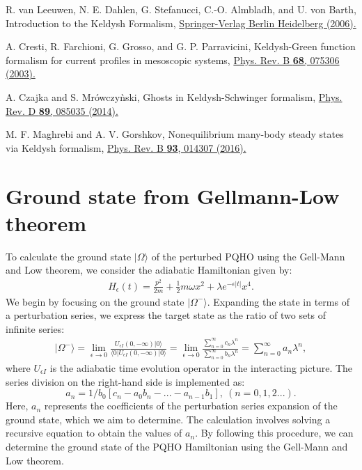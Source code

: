 \documentclass[twocolumn,pra,aps,superscriptaddress]{revtex4-2}
\begin{document}
\begin{thebibliography}{99}
 R. van Leeuwen, N. E. Dahlen, G. Stefanucci, C.-O. Almbladh, and U. von Barth, Introduction to the Keldysh Formalism, \href{10.1007/3-540-35426-3_3}{Springer-Verlag Berlin Heidelberg (2006).}

 A. Cresti, R. Farchioni, G. Grosso, and G. P. Parravicini, Keldysh-Green function formalism for current profiles in mesoscopic systems, \href{https://journals.aps.org/prb/abstract/10.1103/PhysRevB.68.075306}{Phys. Rev. B \textbf{68}, 075306 (2003).}

 A. Czajka and S. Mr\'owczy\`nski, Ghosts in Keldysh-Schwinger formalism, \href{https://journals.aps.org/prd/abstract/10.1103/PhysRevD.89.085035}{Phys. Rev. D \textbf{89}, 085035 (2014).}

 M. F. Maghrebi and A. V. Gorshkov, Nonequilibrium many-body steady states via Keldysh formalism, \href{https://journals.aps.org/prb/abstract/10.1103/PhysRevB.93.014307}{Phys. Rev. B \textbf{93}, 014307 (2016).} 

\end{thebibliography}


\appendix
\section{Ground state from Gellmann-Low theorem}\label{GSGL}

To calculate the ground state $|\Omega\rangle$ of the perturbed PQHO using the Gell-Mann and Low theorem, we consider the adiabatic Hamiltonian given by:
\begin{align}
 H_\epsilon(t)=\frac{p^{2}}{2m}+\frac{1}{2}m\omega x^{2}+\lambda  e^{-\epsilon |t|} x^{4}.
\end{align}
We begin by focusing on the ground state $|\Omega^-\rangle$. Expanding the state in terms of a perturbation series, we express the target state as the ratio of two sets of infinite series:
\begin{align}\label{Omega from G-L}
	|\Omega^-\rangle = \lim_{\epsilon\rightarrow 0} \frac{U_{\epsilon I}(0,-\infty)|0\rangle}{\langle0|U_{\epsilon I }(0, - \infty)|0\rangle} = \lim_{\epsilon\rightarrow 0} \frac{\sum_{n=0}^{\infty}c_n \lambda^n}{\sum_{n=0}^{\infty}b_n \lambda^n} = \sum_{n=0}^{\infty} a_n \lambda^n,
\end{align}
where $U_{\epsilon I}$ is the adiabatic time evolution operator in the interacting picture. The series division on the right-hand side is implemented as:
$$
a_n = {1}/{b_0} \left[ c_n - a_0 b_n -...- a_{n-1} b_1\right],~\left( n=0,1,2...\right).
$$
Here, $a_n$ represents the coefficients of the perturbation series expansion of the ground state, which we aim to determine. The calculation involves solving a recursive equation to obtain the values of $a_n$. By following this procedure, we can determine the ground state of the PQHO Hamiltonian using the Gell-Mann and Low theorem.
\end{document}
